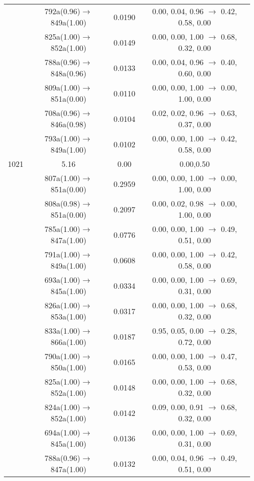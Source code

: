 \documentclass[10pt,a4paper]{article}
\begin{document}
\begin{longtable}{c|c|c|c}
 	& 792a(0.96)$\rightarrow$849a(1.00) &	 0.0190 &	 0.00, 0.04, 0.96 $\rightarrow$ 0.42, 0.58, 0.00 \\ 
 	& 825a(1.00)$\rightarrow$852a(1.00) &	 0.0149 &	 0.00, 0.00, 1.00 $\rightarrow$ 0.68, 0.32, 0.00 \\ 
 	& 788a(0.96)$\rightarrow$848a(0.96) &	 0.0133 &	 0.00, 0.04, 0.96 $\rightarrow$ 0.40, 0.60, 0.00 \\ 
 	& 809a(1.00)$\rightarrow$851a(0.00) &	 0.0110 &	 0.00, 0.00, 1.00 $\rightarrow$ 0.00, 1.00, 0.00 \\ 
 	& 708a(0.96)$\rightarrow$846a(0.98) &	 0.0104 &	 0.02, 0.02, 0.96 $\rightarrow$ 0.63, 0.37, 0.00 \\ 
 	& 793a(1.00)$\rightarrow$849a(1.00) &	 0.0102 &	 0.00, 0.00, 1.00 $\rightarrow$ 0.42, 0.58, 0.00 \\ 
 \hline1021 &	 5.16 &	 0.00 &	 0.00,0.50 \\ 
  	& 807a(1.00)$\rightarrow$851a(0.00) &	 0.2959 &	 0.00, 0.00, 1.00 $\rightarrow$ 0.00, 1.00, 0.00 \\ 
 	& 808a(0.98)$\rightarrow$851a(0.00) &	 0.2097 &	 0.00, 0.02, 0.98 $\rightarrow$ 0.00, 1.00, 0.00 \\ 
 	& 785a(1.00)$\rightarrow$847a(1.00) &	 0.0776 &	 0.00, 0.00, 1.00 $\rightarrow$ 0.49, 0.51, 0.00 \\ 
 	& 791a(1.00)$\rightarrow$849a(1.00) &	 0.0608 &	 0.00, 0.00, 1.00 $\rightarrow$ 0.42, 0.58, 0.00 \\ 
 	& 693a(1.00)$\rightarrow$845a(1.00) &	 0.0334 &	 0.00, 0.00, 1.00 $\rightarrow$ 0.69, 0.31, 0.00 \\ 
 	& 826a(1.00)$\rightarrow$853a(1.00) &	 0.0317 &	 0.00, 0.00, 1.00 $\rightarrow$ 0.68, 0.32, 0.00 \\ 
 	& 833a(1.00)$\rightarrow$866a(1.00) &	 0.0187 &	 0.95, 0.05, 0.00 $\rightarrow$ 0.28, 0.72, 0.00 \\ 
 	& 790a(1.00)$\rightarrow$850a(1.00) &	 0.0165 &	 0.00, 0.00, 1.00 $\rightarrow$ 0.47, 0.53, 0.00 \\ 
 	& 825a(1.00)$\rightarrow$852a(1.00) &	 0.0148 &	 0.00, 0.00, 1.00 $\rightarrow$ 0.68, 0.32, 0.00 \\ 
 	& 824a(1.00)$\rightarrow$852a(1.00) &	 0.0142 &	 0.09, 0.00, 0.91 $\rightarrow$ 0.68, 0.32, 0.00 \\ 
 	& 694a(1.00)$\rightarrow$845a(1.00) &	 0.0136 &	 0.00, 0.00, 1.00 $\rightarrow$ 0.69, 0.31, 0.00 \\ 
 	& 788a(0.96)$\rightarrow$847a(1.00) &	 0.0132 &	 0.00, 0.04, 0.96 $\rightarrow$ 0.49, 0.51, 0.00 \\ 

\end{longtable}
\end{document}
